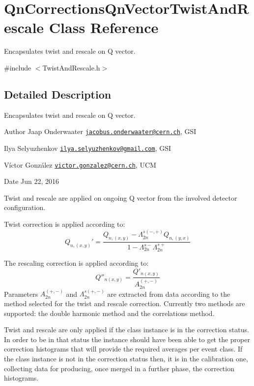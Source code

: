 \hypertarget{classQnCorrectionsQnVectorTwistAndRescale}{}\section{Qn\+Corrections\+Qn\+Vector\+Twist\+And\+Rescale Class Reference}
\label{classQnCorrectionsQnVectorTwistAndRescale}


Encapsulates twist and rescale on Q vector.  




{\ttfamily \#include $<$Twist\+And\+Rescale.\+h$>$}



\subsection{Detailed Description}
Encapsulates twist and rescale on Q vector. 

\begin{DoxyAuthor}{Author}
Jaap Onderwaater \href{mailto:jacobus.onderwaater@cern.ch}{\tt jacobus.\+onderwaater@cern.\+ch}, G\+SI 

Ilya Selyuzhenkov \href{mailto:ilya.selyuzhenkov@gmail.com}{\tt ilya.\+selyuzhenkov@gmail.\+com}, G\+SI 

Víctor González \href{mailto:victor.gonzalez@cern.ch}{\tt victor.\+gonzalez@cern.\+ch}, U\+CM 
\end{DoxyAuthor}
\begin{DoxyDate}{Date}
Jun 22, 2016
\end{DoxyDate}
Twist and rescale are applied on ongoing Q vector from the involved detector configuration.

Twist correction is applied according to\+: \[ Q_{n,(x,y)}' = \frac{Q_{n,(x,y)} - \Lambda^{s(-,+)}_{2n} Q_{n,(y,x)}}{1 - \Lambda^{s-}_{2n}\Lambda^{s+}_{2n}} \]

The rescaling correction is applied according to\+: \[ Q''_{n(x,y)} = \frac{Q'_{n(x,y)}}{A_{2n}^{(+,-)}} \] Parameters $ A_{2n}^{(+,-)} $ and $ \Lambda^{s(+,-)}_{2n} $ are extracted from data according to the method selected for the twist and rescale correction. Currently two methods are supported\+: the double harmonic method and the correlations method.

Twist and rescale are only applied if the class instance is in the correction status. In order to be in that status the instance should have been able to get the proper correction histograms that will provide the required averages per event class. If the class instance is not in the correction status then, it is in the calibration one, collecting data for producing, once merged in a further phase, the correction histograms.

